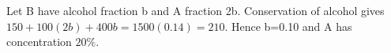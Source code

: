 Let B have alcohol fraction b and A fraction 2b. Conservation of alcohol gives $150+100(2b)+400b=1500(0.14)=210$. Hence b=0.10 and A has concentration $\boxed{20\%}$.
